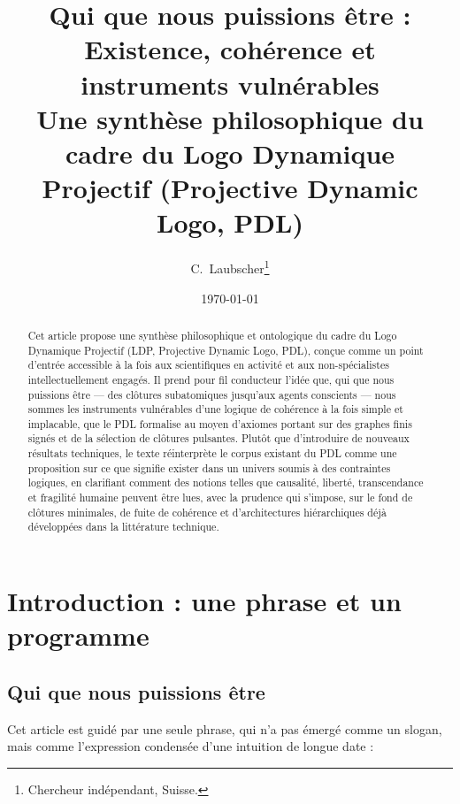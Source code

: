 \documentclass[11pt,a4paper]{article}
\theoremstyle{definition}
\begin{document}
\title{Qui que nous puissions être :\\[4pt]
Existence, cohérence et instruments vulnérables\\[4pt]
Une synthèse philosophique du cadre du Logo Dynamique Projectif (Projective Dynamic Logo, PDL)}

\author{C.~Laubscher\thanks{Chercheur indépendant, Suisse.}\\[4pt]}

\date{\small \today}

\maketitle

\begin{abstract}
Cet article propose une synthèse philosophique et ontologique du cadre du Logo Dynamique Projectif (LDP, Projective Dynamic Logo, PDL), conçue comme un point d’entrée accessible à la fois aux scientifiques en activité et aux non-spécialistes intellectuellement engagés. Il prend pour fil conducteur l’idée que, qui que nous puissions être — des clôtures subatomiques jusqu’aux agents conscients — nous sommes les instruments vulnérables d’une logique de cohérence à la fois simple et implacable, que le PDL formalise au moyen d’axiomes portant sur des graphes finis signés et de la sélection de clôtures pulsantes. Plutôt que d’introduire de nouveaux résultats techniques, le texte réinterprète le corpus existant du PDL comme une proposition sur ce que signifie exister dans un univers soumis à des contraintes logiques, en clarifiant comment des notions telles que causalité, liberté, transcendance et fragilité humaine peuvent être lues, avec la prudence qui s’impose, sur le fond de clôtures minimales, de fuite de cohérence et d’architectures hiérarchiques déjà développées dans la littérature technique.
\end{abstract}

\tableofcontents

\section{Introduction : une phrase et un programme}
\label{sec:intro}

\subsection{Qui que nous puissions être}

Cet article est guidé par une seule phrase, qui n’a pas émergé comme un slogan, mais comme l’expression condensée d’une intuition de longue date :
\end{document}
